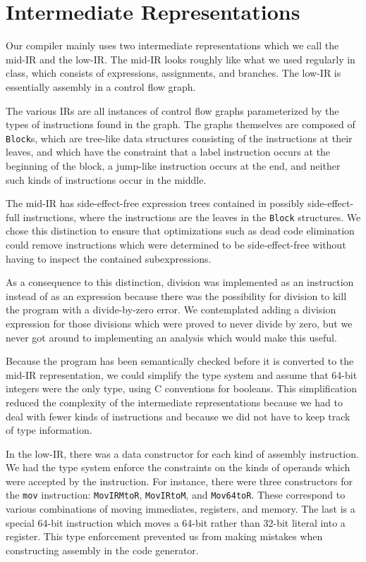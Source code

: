 \documentclass[11pt]{article}
\begin{document}
\section{Intermediate Representations}

Our compiler mainly uses two intermediate representations which we
call the mid-IR and the low-IR.  The mid-IR looks roughly like what we
used regularly in class, which consists of expressions, assignments,
and branches. The low-IR is essentially assembly in a control flow
graph.

The various IRs are all instances of control flow graphs parameterized
by the types of instructions found in the graph.  The graphs
themselves are composed of \texttt{Block}s, which are tree-like data
structures consisting of the instructions at their leaves, and which
have the constraint that a label instruction occurs at the beginning
of the block, a jump-like instruction occurs at the end, and neither
such kinds of instructions occur in the middle.

The mid-IR has side-effect-free expression trees contained in possibly
side-effect-full instructions, where the instructions are the leaves
in the \texttt{Block} structures.  We chose this distinction to ensure
that optimizations such as dead code elimination could remove
instructions which were determined to be side-effect-free without
having to inspect the contained subexpressions.

As a consequence to this distinction, division was implemented as an
instruction instead of as an expression because there was the
possibility for division to kill the program with a divide-by-zero
error.  We contemplated adding a division expression for those
divisions which were proved to never divide by zero, but we never got
around to implementing an analysis which would make this useful.

Because the program has been semantically checked before it is
converted to the mid-IR representation, we could simplify the type
system and assume that 64-bit integers were the only type, using C
conventions for booleans.  This simplification reduced the complexity
of the intermediate representations because we had to deal with fewer
kinds of instructions and because we did not have to keep track of
type information.

In the low-IR, there was a data constructor for each kind of assembly
instruction.  We had the type system enforce the constraints on the
kinds of operands which were accepted by the instruction.  For
instance, there were three constructors for the \texttt{mov}
instruction: \texttt{MovIRMtoR}, \texttt{MovIRtoM}, and
\texttt{Mov64toR}.  These correspond to various combinations of moving
immediates, registers, and memory.  The last is a special 64-bit
instruction which moves a 64-bit rather than 32-bit literal into a
register.  This type enforcement prevented us from making mistakes
when constructing assembly in the code generator.
\end{document}
